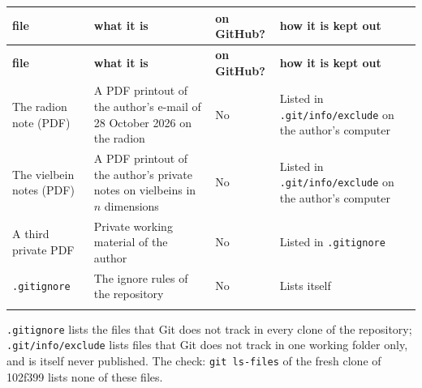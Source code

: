 \documentclass[10pt,a4paper]{article}
\begin{document}
{\footnotesize
\begin{longtable}{>{\raggedright\arraybackslash}p{}>{\raggedright\arraybackslash}p{}>{\raggedright\arraybackslash}p{}>{\raggedright\arraybackslash}p{}}
\toprule
\textbf{file} & \textbf{what it is} & \textbf{on GitHub?} & \textbf{how it is kept out} \\
\midrule\endfirsthead
\toprule
\textbf{file} & \textbf{what it is} & \textbf{on GitHub?} & \textbf{how it is kept out} \\
\midrule\endhead
\endfoot
\bottomrule\endlastfoot
The radion note (PDF) & A PDF printout of the author’s e-mail of 28 October 2026 on the radion & No & Listed in \texttt{.git/\allowbreak{}info/\allowbreak{}exclude} on the author’s computer \\
The vielbein notes (PDF) & A PDF printout of the author’s private notes on vielbeins in $n$ dimensions & No & Listed in \texttt{.git/\allowbreak{}info/\allowbreak{}exclude} on the author’s computer \\
A third private PDF & Private working material of the author & No & Listed in \texttt{.gitignore} \\
\texttt{.gitignore} & The ignore rules of the repository & No & Lists itself \\*
\end{longtable}}
\texttt{.gitignore} lists the files that Git does not track in every clone of the repository; \texttt{.git/\allowbreak{}info/\allowbreak{}exclude} lists files that Git does not track in one working folder only, and is itself never published. The check: \texttt{git ls-files} of the fresh clone of 102f399 lists none of these files.
\end{document}
